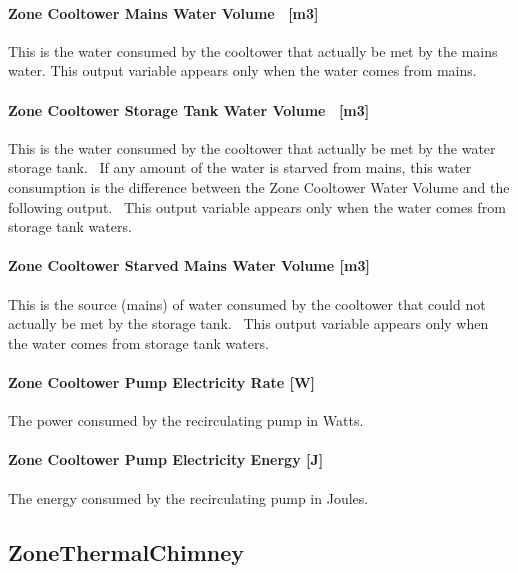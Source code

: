 \paragraph{Zone Cooltower Mains Water Volume ~{[}m3{]}}\label{zone-cooltower-mains-water-volume-m3}

This is the water consumed by the cooltower that actually be met by the mains water. This output variable appears only when the water comes from mains.

\paragraph{Zone Cooltower Storage Tank Water Volume ~{[}m3{]}}\label{zone-cooltower-storage-tank-water-volume-m3}

This is the water consumed by the cooltower that actually be met by the water storage tank.~ If any amount of the water is starved from mains, this water consumption is the difference between the Zone Cooltower Water Volume and the following output.~ This output variable appears only when the water comes from storage tank waters.

\paragraph{Zone Cooltower Starved Mains Water Volume {[}m3{]}}\label{zone-cooltower-starved-mains-water-volume-m3}

This is the source (mains) of water consumed by the cooltower that could not actually be met by the storage tank. ~This output variable appears only when the water comes from storage tank waters.

\paragraph{Zone Cooltower Pump Electricity Rate {[}W{]}}\label{zone-cooltower-pump-electric-power-w}

The power consumed by the recirculating pump in Watts.

\paragraph{Zone Cooltower Pump Electricity Energy {[}J{]}}\label{zone-cooltower-pump-electric-energy-j}

The energy consumed by the recirculating pump in Joules.

\subsection{ZoneThermalChimney}\label{zonethermalchimney-thermal-chimney}

